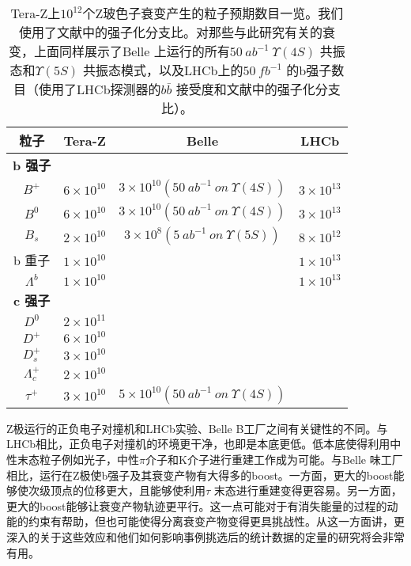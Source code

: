 \begin{table}[!h]
	\vspace{20pt}
	\centering
	\begin{tabular}{cccc}
		\toprule
		{\bfseries 粒子} &{\bfseries Tera-Z} & {\bfseries Belle \RNum{2}} & {\bfseries LHCb} \\
		\hline
		{\bfseries b 强子} \\
		$B^+$ & $6\times 10^{10}$ & $3\times 10^{10}(50\ ab^{-1}\ on\ \Upsilon(4S))$ & $3\times 10^{13}$ \\
		$B^0$ & $6\times 10^{10}$ & $3\times 10^{10}(50\ ab^{-1}\ on\ \Upsilon(4S))$ & $3\times 10^{13}$ \\
		$B_s$ & $2\times 10^{10}$ & $3\times 10^{8}(5\ ab^{-1}\ on\ \Upsilon(5S))$ & $8\times 10^{12}$ \\
		b 重子  & $1\times 10^{10}$ &  & $1\times 10^{13}$ \\
		$\Lambda^b$  & $1\times 10^{10}$ &  & $1\times 10^{13}$ \\
		{\bfseries c 强子}\\
		$D^0$ & $2\times 10^{11}$ \\
		$D^+$ &  $6\times 10^{10}$ \\
		$D^+_s$ & $3\times 10^{10}$ \\
		$\Lambda^+_c$ & $2\times 10^{10}$ \\
		$\tau^+$ & $3\times 10^{10}$ & $ 5\times 10^{10}(50\ ab^{-1}\ on\ \Upsilon(4S))$ \\
		\bottomrule       
	\end{tabular}
	\caption{Tera-Z上$10^{12}$个Z玻色子衰变产生的粒子预期数目一览。我们使用了文献中的强子化分支比。对那些与此研究有关的衰变，上面同样展示了Belle  上运行的所有$ 50\ ab^{-1}\ \Upsilon(4S)$ 共振态和$\Upsilon(5S)$ 共振态模式，以及LHCb上的$50\ fb^{-1}$ 的b强子数目（使用了LHCb探测器的$b\bar{b}$ 接受度和文献中的强子化分支比）。 }
	\label{Table2.4}
\end{table}


Z极运行的正负电子对撞机和LHCb实验、Belle  B工厂之间有关键性的不同。与LHCb相比，正负电子对撞机的环境更干净，也即是本底更低。低本底使得利用中性末态粒子例如光子，中性$\pi$介子和K介子进行重建工作成为可能。与Belle  味工厂相比，运行在Z极使b强子及其衰变产物有大得多的boost。一方面，更大的boost能够使次级顶点的位移更大，且能够使利用$\tau$ 末态进行重建变得更容易。另一方面，更大的boost能够让衰变产物轨迹更平行。这一点可能对于有消失能量的过程的动能的约束有帮助，但也可能使得分离衰变产物变得更具挑战性。从这一方面讲，更深入的关于这些效应和他们如何影响事例挑选后的统计数据的定量的研究将会非常有用。


